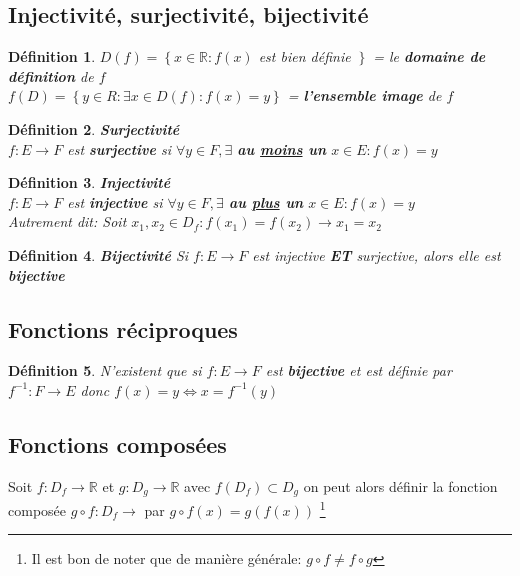 \documentclass[10pt,a4paper]{book}
\newcommand{\R}{\mathbb{R}}
\newtheorem{definition}{Définition}[section]
\begin{document}
\subsection{Injectivité, surjectivité, bijectivité}

\begin{definition}
$D(f) = \left\lbrace x \in \R: f(x) \right.$ est bien définie $\left. \right\rbrace$ = le \textbf{domaine de définition} de $f$ \\
$f(D) = \left\lbrace y \in R: \exists x \in D(f): f(x) = y \right\rbrace$ = \textbf{l'ensemble image} de $f$
\end{definition}

\begin{definition} \textbf{Surjectivité}\\
$f: E \rightarrow F$ est \textbf{surjective} si $\forall y \in F, \exists$ \textbf{au \underline{moins} un} $x\in E: f(x) = y$
\end{definition}

\begin{definition} \textbf{Injectivité}\\
$f: E \rightarrow F$ est \textbf{injective} si $\forall y \in F, \exists$ \textbf{au \underline{plus} un} $x\in E: f(x) = y$ \\
Autrement dit: Soit $x_1, x_2 \in D_f: f(x_1) = f(x_2) \rightarrow x_1 = x_2$
\end{definition}

\begin{definition} \textbf{Bijectivité}
Si $f: E \rightarrow F$ est injective \textbf{ET} surjective, alors elle est \textbf{bijective}
\end{definition}

\subsection{Fonctions réciproques}

\begin{definition}
N'existent que si $f: E \rightarrow F$ est \textbf{bijective} et est définie par $f^{-1}: F \rightarrow E$ donc $f(x) = y \Leftrightarrow x = f^{-1}(y)$
\end{definition}

\subsection{Fonctions composées}

Soit $f: D_f \rightarrow \R$ et $g: D_g \rightarrow \R$ avec $f(D_f) \subset D_g$ on peut alors définir la fonction composée $g\circ f : D_f \rightarrow$ par $g\circ f(x) = g(f(x))$ \footnote{Il est bon de noter que de manière générale: $g\circ f \neq f\circ g$}
\end{document}
